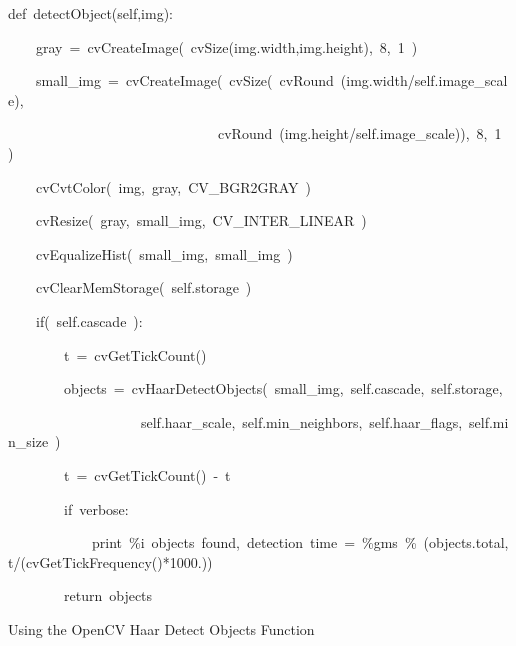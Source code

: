 \documentclass[english]{IEEEtran}
\theoremstyle{plain}
\newenvironment{lyxcode}
{\par\begin{list}{}{
\setlength{\rightmargin}{\leftmargin}
\setlength{\listparindent}{0pt}%
\raggedright
\setlength{\itemsep}{0pt}
\setlength{\parsep}{0pt}
\normalfont\ttfamily}%
 \item[]}
{\end{list}}
\begin{document}
%
\begin{algorithm*}
\begin{lyxcode}
def~detectObject(self,img):

~~~~gray~=~cvCreateImage(~cvSize(img.width,img.height),~8,~1~)

~~~~small\_img~=~cvCreateImage(~cvSize(~cvRound~(img.width/self.image\_scale),~

~~~~~~~~~~~~~~~~~~~~~~~~~~~~~~cvRound~(img.height/self.image\_scale)),~8,~1~)

~~~~cvCvtColor(~img,~gray,~CV\_BGR2GRAY~)

~~~~cvResize(~gray,~small\_img,~CV\_INTER\_LINEAR~)

~~~~cvEqualizeHist(~small\_img,~small\_img~)

~~~~cvClearMemStorage(~self.storage~)

~~~~if(~self.cascade~):

~~~~~~~~t~=~cvGetTickCount()

~~~~~~~~objects~=~cvHaarDetectObjects(~small\_img,~self.cascade,~self.storage,

~~~~~~~~~~~~~~~~~~~self.haar\_scale,~self.min\_neighbors,~self.haar\_flags,~self.min\_size~)

~~~~~~~~t~=~cvGetTickCount()~-~t

~~~~~~~~if~verbose:

~~~~~~~~~~~~print~\textquotedbl{}\%i~objects~found,~detection~time~=~\%gms\textquotedbl{}~\%~(objects.total,t/(cvGetTickFrequency(){*}1000.))

~~~~~~~~return~objects
\end{lyxcode}
\caption{\label{alg:OpenCV-Haar-detect}Using the OpenCV Haar Detect Objects
Function}

\end{algorithm*}
\end{document}
